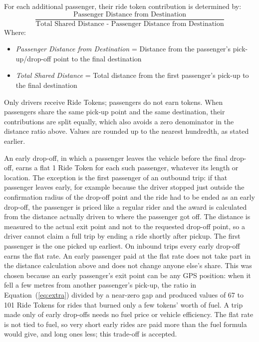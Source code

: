 For each additional passenger, their ride token contribution is determined by:
\begin{equation}
    \label{eq:extra}
    \frac{\text{Passenger Distance from Destination}}{\text{Total Shared Distance - Passenger Distance from Destination}}
\end{equation}
Where: 
\begin{itemize}
    \item \textit{Passenger Distance from Destination} = Distance from the passenger’s pick-up/drop-off point to the final destination

    \item \textit{Total Shared Distance} = Total distance from the first passenger’s pick-up to the final destination
\end{itemize}

Only drivers receive Ride Tokens; passengers do not earn tokens. When passengers share the same pick-up point and the same destination, their contributions are split equally, which also avoids a zero denominator in the distance ratio above. Values are rounded up to the nearest hundredth, as stated earlier.

An early drop-off, in which a passenger leaves the vehicle before the final drop-off, earns a flat 1 Ride Token for each such passenger, whatever its length or location. The exception is the first passenger of an outbound trip: if that passenger leaves early, for example because the driver stopped just outside the confirmation radius of the drop-off point and the ride had to be ended as an early drop-off, the passenger is priced like a regular rider and the award is calculated from the distance actually driven to where the passenger got off. The distance is measured to the actual exit point and not to the requested drop-off point, so a driver cannot claim a full trip by ending a ride shortly after pickup. The first passenger is the one picked up earliest. On inbound trips every early drop-off earns the flat rate. An early passenger paid at the flat rate does not take part in the distance calculation above and does not change anyone else's share. This was chosen because an early passenger's exit point can be any GPS position: when it fell a few metres from another passenger's pick-up, the ratio in Equation~(\ref{eq:extra}) divided by a near-zero gap and produced values of 67 to 101 Ride Tokens for rides that burned only a few tokens' worth of fuel. A trip made only of early drop-offs needs no fuel price or vehicle efficiency. The flat rate is not tied to fuel, so very short early rides are paid more than the fuel formula would give, and long ones less; this trade-off is accepted.

